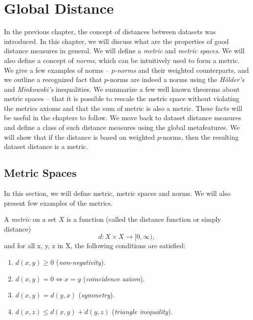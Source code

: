 
\chapter{Global Distance}
\label{chapter:globalDistance}
In the previous chapter, the concept of distances between datasets was introduced. In this chapter, we will discuss what are the properties of good distance measures in general. We will define a \emph{metric} and \emph{metric spaces}. We will also define a concept of \emph{norms}, which can be intuitively used to form a metric. We give a few examples of norms -- \emph{$p$-norms} and their weighted counterparts, and we outline a recognized fact that $p$-norms are indeed a norms using the \emph{H\"older's} and \emph{Minkowski's} inequalities. We summarize a few well known theorems about metric spaces -- that it is possible to rescale the metric space without violating the metrics axioms and that the sum of metric is also a metric. These facts will be useful in the chapters to follow. We move back to dataset distance measures and define a class of such distance measures using the global metafeatures. We will show that if the distance is based on weighted $p$-norms, then the resulting dataset distance is a metric. 

\section{Metric Spaces}
In this section, we will define metric, metric spaces and norms. We will also present few examples of the metrics.

\begin{definition}
	\label{definition:metric}
	A \emph{metric} on a set $X$ is a function (called the distance function or simply distance)
	\begin{equation}
	d : X \times X \rightarrow [0,\infty),
	\end{equation}
	and for all x, y, z in X, the following conditions are satisfied:
	\begin{enumerate}
		\item $d(x,y) \geq 0$ (\emph{non-negativity}).
		\item $d(x,y) = 0 \Leftrightarrow x = y$ (\emph{coincidence axiom}).
		\item $d(x,y) = d(y,x)$ (\emph{symmetry}).
		\item $d(x,z) \leq d(x,y) + d(y,z)$ (\emph{triangle inequality}).
	\end{enumerate}	
\end{definition}

